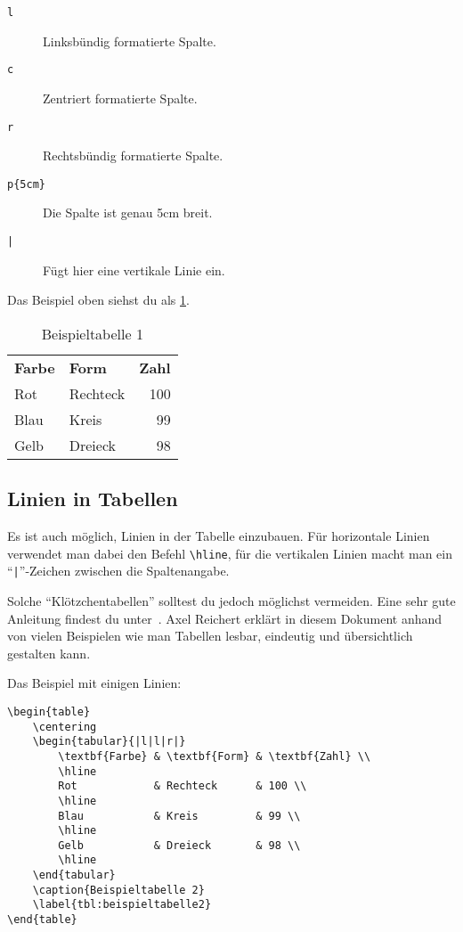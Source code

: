 \begin{description}
	\item[\texttt{l}] Linksbündig formatierte Spalte.
	\item[\texttt{c}] Zentriert formatierte Spalte.
	\item[\texttt{r}] Rechtsbündig formatierte Spalte.
	\item[\texttt{p\{5cm\}}] Die Spalte ist genau 5cm breit.
	\item[\texttt{|}] Fügt hier eine vertikale Linie ein.
\end{description}

Das Beispiel oben siehst du als \cref{tbl:beispieltabelle1}.

\begin{table}
	\centering
	\begin{tabular}{llr}
		\textbf{Farbe} & \textbf{Form} & \textbf{Zahl} \\
		Rot            & Rechteck      & 100 \\
		Blau           & Kreis         & 99 \\
		Gelb           & Dreieck       & 98 \\
	\end{tabular}
	\caption{Beispieltabelle 1}
	\label{tbl:beispieltabelle1}
\end{table}

\subsection{Linien in Tabellen}
\label{sec:linienintabellen}

Es ist auch möglich, Linien in der Tabelle einzubauen. Für horizontale Linien verwendet man dabei den Befehl \texttt{\textbackslash hline}, für die vertikalen Linien macht man ein \enquote{\texttt{|}}-Zeichen zwischen die Spaltenangabe.

Solche \enquote{Klötzchentabellen} solltest du jedoch möglichst vermeiden. Eine sehr gute Anleitung findest du unter~\cite{TabSatz}. Axel Reichert erklärt in diesem Dokument anhand von vielen Beispielen wie man Tabellen lesbar, eindeutig und übersichtlich gestalten kann.

Das Beispiel mit einigen Linien:
\begin{lstlisting}
\begin{table}
	\centering
	\begin{tabular}{|l|l|r|}
		\textbf{Farbe} & \textbf{Form} & \textbf{Zahl} \\
		\hline
		Rot            & Rechteck      & 100 \\
		\hline
		Blau           & Kreis         & 99 \\
		\hline
		Gelb           & Dreieck       & 98 \\
		\hline
	\end{tabular}
	\caption{Beispieltabelle 2}
	\label{tbl:beispieltabelle2}
\end{table}
\end{lstlisting}

